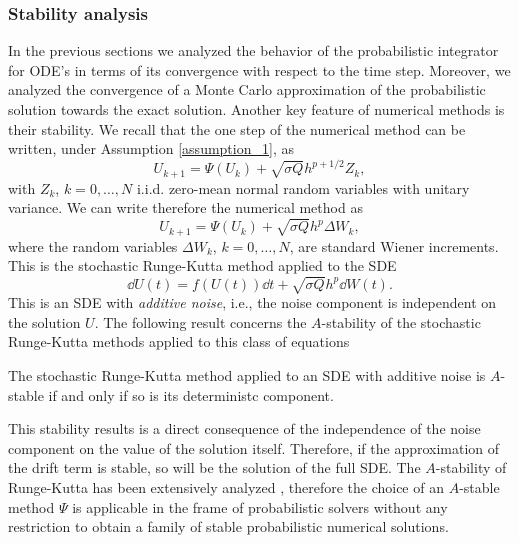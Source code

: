\subsubsection{Stability analysis}

In the previous sections we analyzed the behavior of the probabilistic integrator for ODE's in terms of its convergence with respect to the time step. Moreover, we analyzed the convergence of a Monte Carlo approximation of the probabilistic solution towards the exact solution. Another key feature of numerical methods is their stability. We recall that the one step of the numerical method can be written, under Assumption \ref{assumption_1}, as
\begin{equation}
	U_{k+1} = \Psi(U_{k}) + \sqrt{\sigma Q}h^{p+1/2}Z_k,
\end{equation}
with $Z_k$, $k = 0, \ldots, N$ i.i.d. zero-mean normal random variables with unitary variance. We can write therefore the numerical method as
\begin{equation}
	U_{k+1} = \Psi(U_{k}) + \sqrt{\sigma Q}h^{p}\Delta W_k,
\end{equation}
where the random variables $\Delta W_k$, $k = 0, \ldots, N$, are standard Wiener increments. This is the stochastic Runge-Kutta method applied to the SDE
\begin{equation}
	\dd U(t) = f(U(t))\dd t + \sqrt{\sigma Q}h^p \dd W(t).
\end{equation}
This is an SDE with \textit{additive noise}, i.e., the noise component is independent on the solution $U$. The following result concerns the $A$-stability of the stochastic Runge-Kutta methods applied to this class of equations \cite[Theorem 4.1.]{HeS92}
\begin{theorem} The stochastic Runge-Kutta method applied to an SDE with additive noise is $A$-stable if and only if so is its deterministc component.
\end{theorem}
\noindent This stability results is a direct consequence of the independence of the noise component on the value of the solution itself. Therefore, if the approximation of the drift term is stable, so will be the solution of the full SDE. The $A$-stability of Runge-Kutta has been extensively analyzed \cite{HaW96}, therefore the choice of an $A$-stable method $\Psi$ is applicable in the frame of probabilistic solvers without any restriction to obtain a family of stable probabilistic numerical solutions.